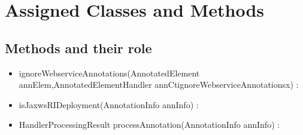 \section{Assigned Classes and Methods}

	\subsection{Methods and their role}
		\begin{itemize}
			\item ignoreWebserviceAnnotations(AnnotatedElement annElem,AnnotatedElementHandler annCtignoreWebserviceAnnotationsx) :
			\item isJaxwsRIDeployment(AnnotationInfo annInfo) : 
			\item HandlerProcessingResult processAnnotation(AnnotationInfo annInfo) :
		\end{itemize}
